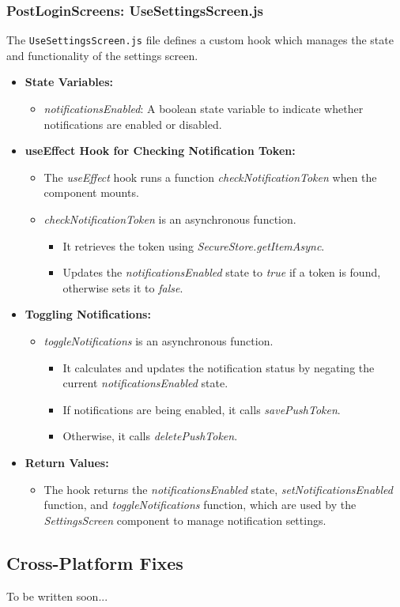 \subsubsection{PostLoginScreens: UseSettingsScreen.js}

The \texttt{UseSettingsScreen.js} file defines a custom hook which manages the state and functionality of the settings screen.

\begin{itemize}
    \item \textbf{State Variables:}
    \begin{itemize}
        \item \textit{notificationsEnabled}: A boolean state variable to indicate whether notifications are enabled or disabled.
    \end{itemize}

    \item \textbf{useEffect Hook for Checking Notification Token:}
    \begin{itemize}
        \item The \textit{useEffect} hook runs a function \textit{checkNotificationToken} when the component mounts.
        \item \textit{checkNotificationToken} is an asynchronous function.
        \begin{itemize}
            \item It retrieves the token using \textit{SecureStore.getItemAsync}.
            \item Updates the \textit{notificationsEnabled} state to \textit{true} if a token is found, otherwise sets it to \textit{false}.
        \end{itemize}
    \end{itemize}

    \item \textbf{Toggling Notifications:}
    \begin{itemize}
        \item \textit{toggleNotifications} is an asynchronous function.
        \begin{itemize}
            \item It calculates and updates the notification status by negating the current \textit{notificationsEnabled} state.
            \item If notifications are being enabled, it calls \textit{savePushToken}.
            \item Otherwise, it calls \textit{deletePushToken}.
        \end{itemize}
    \end{itemize}

    \item \textbf{Return Values:}
    \begin{itemize}
        \item The hook returns the \textit{notificationsEnabled} state, \textit{setNotificationsEnabled} function, and \textit{toggleNotifications} function, which are used by the \textit{SettingsScreen} component to manage notification settings.
    \end{itemize}
\end{itemize}

\subsection{Cross-Platform Fixes}

To be written soon...
